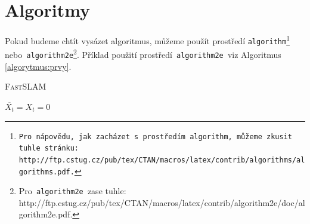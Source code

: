 \documentclass[a4paper, 11 pt]{article}
\begin{document}
\section{Algoritmy}
\label{cast:algoritmus}
Pokud budeme chtít vysázet algoritmus, můžeme použít prostředí \texttt{algorithm\footnote{Pro nápovědu, jak zacházet s~prostředím\texttt{ algorithm,} můžeme zkusit tuhle stránku:\\http://ftp.cstug.cz/pub/tex/CTAN/macros/latex/contrib/algorithms/algorithms.pdf.} }nebo\texttt{ algorithm2e}\footnote{Pro\texttt{ algorithm2e }zase tuhle: http://ftp.cstug.cz/pub/tex/CTAN/macros/latex/contrib/algorithm2e/doc/algorithm2e.pdf.}. Příklad použití prostředí\texttt{ algorithm2e }viz Algoritmus~
\ref{algorytmus:prvy}.
\bigskip
\IncMargin{1.5em}
\begin{algorithm}
		\caption{\textsc{FastSLAM}}
		\label{algorytmus:prvy}

		\SetNlSty{}{}{:}
		\SetNlSkip{0.4em}
		\SetInd{1em}{1em}
		\Indm\Indmm
		\Indp\Indpp
		\BlankLine

		$ \overline{X_t} = X_t = 0 $ \\



	\end{algorithm}
	\DecMargin{1.5em}
\end{document}
